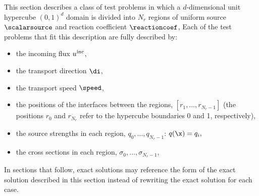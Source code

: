 This section describes a class of test problems in which a $d$-dimensional unit
hypercube $(0,1)^d$ domain is divided into $N_r$ regions of uniform
source $\scalarsource$ and reaction coefficient $\reactioncoef$,
Each of the test problems that fit this description are fully described by:
\begin{itemize}
  \item the incoming flux $u^{\textup{inc}}$,
  \item the transport direction $\di$,
  \item the transport speed $\speed$,
  \item the positions of the interfaces between the regions,
    $[r_1,\ldots,r_{N_r-1}]$ (the positions $r_0$ and $r_{N_r}$
    refer to the hypercube boundaries 0 and 1, respectively),
  \item the source strengths in each region, $q_0,\ldots,q_{N_r-1}$:
    $q(\x) = q_i,\qquad $
  \item the cross sections in each region, $\sigma_0,\ldots,\sigma_{N_r-1}$,
\end{itemize}
In sections that follow, exact solutions may reference the form of the
exact solution described in this section instead of rewriting the exact
solution for each case.

